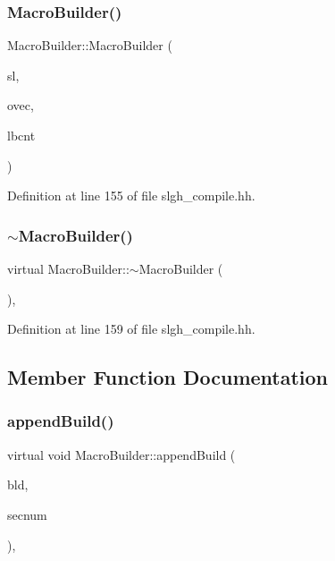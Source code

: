 \subsubsection{\texorpdfstring{MacroBuilder()}{MacroBuilder()}}
{\footnotesize\ttfamily Macro\+Builder\+::\+Macro\+Builder (\begin{DoxyParamCaption}\item[{\mbox{\hyperlink{class_sleigh_compile}{Sleigh\+Compile}} $\ast$}]{sl,  }\item[{vector$<$ \mbox{\hyperlink{class_op_tpl}{Op\+Tpl}} $\ast$ $>$ \&}]{ovec,  }\item[{uint4}]{lbcnt }\end{DoxyParamCaption})\hspace{0.3cm}{\ttfamily [inline]}}



Definition at line 155 of file slgh\+\_\+compile.\+hh.

\mbox{\label{class_macro_builder_a9a59534f6b32a891abc84d5006f320d5}} 
\subsubsection{\texorpdfstring{$\sim$MacroBuilder()}{~MacroBuilder()}}
{\footnotesize\ttfamily virtual Macro\+Builder\+::$\sim$\+Macro\+Builder (\begin{DoxyParamCaption}\item[{void}]{ }\end{DoxyParamCaption})\hspace{0.3cm}{\ttfamily [inline]}, {\ttfamily [virtual]}}



Definition at line 159 of file slgh\+\_\+compile.\+hh.



\subsection{Member Function Documentation}
\mbox{\label{class_macro_builder_a03bea914f6f63a779c6dd7c6d547c5d8}} 
\subsubsection{\texorpdfstring{appendBuild()}{appendBuild()}}
{\footnotesize\ttfamily virtual void Macro\+Builder\+::append\+Build (\begin{DoxyParamCaption}\item[{\mbox{\hyperlink{class_op_tpl}{Op\+Tpl}} $\ast$}]{bld,  }\item[{int4}]{secnum }\end{DoxyParamCaption})\hspace{0.3cm}{\ttfamily [inline]}, {\ttfamily [virtual]}}



